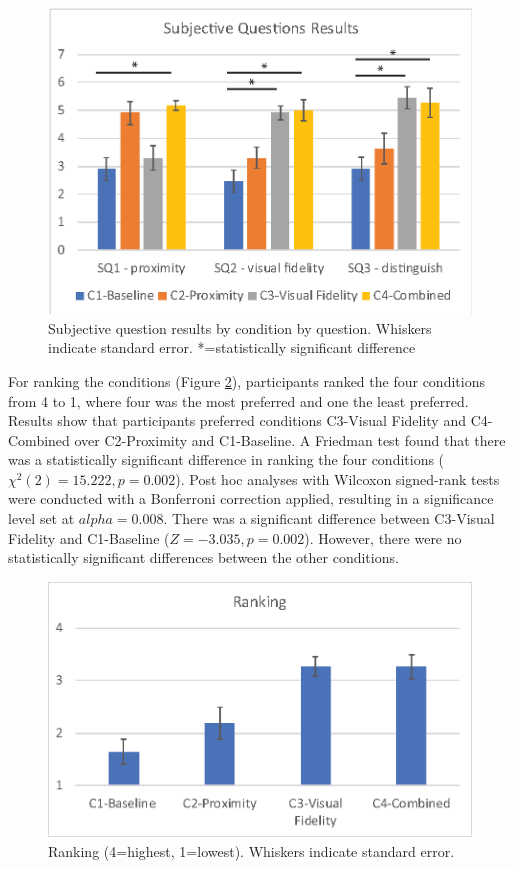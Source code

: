 \begin{figure}[ht]
    \centering
    \includegraphics[width=0.8\linewidth]{images/41-visualising-mgia17/analysis-images-05.eps}
    \caption{Subjective question results by condition by question. Whiskers indicate standard error. *=statistically significant difference}
    \label{fig:contacts:sq2}
\end{figure}

For ranking the conditions (Figure \ref{fig:contacts:ranking}), participants ranked the four conditions from 4 to 1, where four was the most preferred and one the least preferred. Results show that participants preferred conditions C3-Visual Fidelity and C4-Combined over C2-Proximity and C1-Baseline. A Friedman test found that there was a statistically significant difference in ranking the four conditions ($\chi^2(2)=15.222,p=0.002$). Post hoc analyses with Wilcoxon signed-rank tests were conducted with a Bonferroni correction applied, resulting in a significance level set at $alpha=0.008$. There was a significant difference between C3-Visual Fidelity and C1-Baseline ($Z=-3.035, p=0.002$). However, there were no statistically significant differences between the other conditions.

\begin{figure}[ht]
    \centering
    \includegraphics[width=0.8\linewidth]{images/41-visualising-mgia17/analysis-images-04.eps}
    \caption{Ranking (4=highest, 1=lowest). Whiskers indicate standard error.}
    \label{fig:contacts:ranking}
\end{figure}

